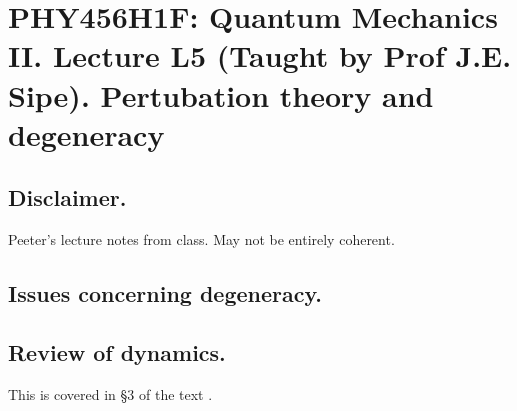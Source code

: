 
%

\chapter{PHY456H1F: Quantum Mechanics II.  Lecture L5 (Taught by Prof J.E. Sipe).  Pertubation theory and degeneracy}
\label{chap:qmTwoL5}
{}
\date{Sept 23, 2011}

\beginArtWithToc

\section{Disclaimer.}

Peeter's lecture notes from class.  May not be entirely coherent.

\section{Issues concerning degeneracy.}

\section{Review of dynamics.}

This is covered in \S 3 of the text \cite{desai2009quantum}.

\EndArticle
